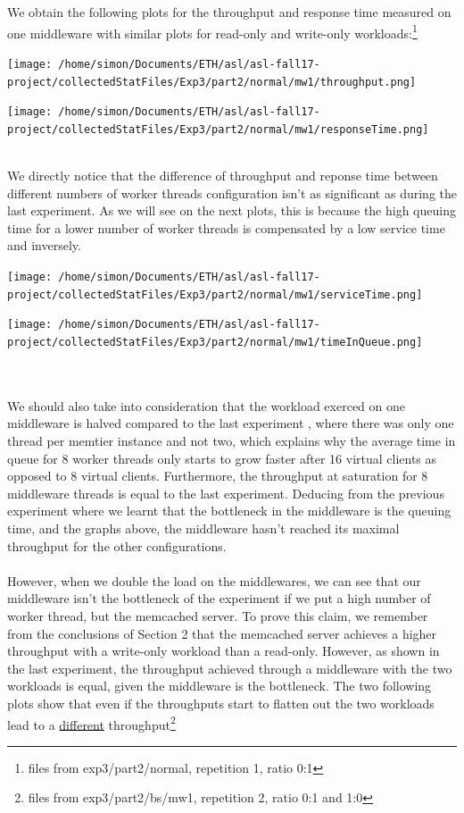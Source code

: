 \documentclass[11pt,a4paper]{article}
\begin{document}
We obtain the following plots for the throughput and response time measured on one middleware with similar plots for read-only and write-only workloads:\footnote{files from exp3/part2/normal, repetition 1, ratio 0:1}
\\
\begin{minipage}{0.42\linewidth}
\texttt{[image: /home/simon/Documents/ETH/asl/asl-fall17-project/collectedStatFiles/Exp3/part2/normal/mw1/throughput.png]}
\end{minipage}
\hfill
\begin{minipage}{0.42\linewidth}
\texttt{[image: /home/simon/Documents/ETH/asl/asl-fall17-project/collectedStatFiles/Exp3/part2/normal/mw1/responseTime.png]}
\end{minipage}
\\
We directly notice that the difference of throughput and reponse time between different numbers of worker threads configuration isn't as significant as during the last experiment. As we will see on the next plots, this is because the high queuing time for a lower number of worker threads is compensated by a low service time and inversely. 
\\
\begin{minipage}{0.49\linewidth}
\texttt{[image: /home/simon/Documents/ETH/asl/asl-fall17-project/collectedStatFiles/Exp3/part2/normal/mw1/serviceTime.png]}
\end{minipage}
\hfill
\begin{minipage}{0.49\linewidth}
\texttt{[image: /home/simon/Documents/ETH/asl/asl-fall17-project/collectedStatFiles/Exp3/part2/normal/mw1/timeInQueue.png]}
\end{minipage}
\\\\ 
We should also take into consideration that the workload exerced on one middleware is halved compared to the last experiment , where there was only one thread per memtier instance and not two, which explains why the average time in queue for 8 worker threads only starts to grow faster after 16 virtual clients as opposed to 8 virtual clients. Furthermore, the throughput at saturation for 8 middleware threads is equal to the last experiment. 
Deducing from the previous experiment where we learnt that the bottleneck in the middleware is the queuing time, and the graphs above, the middleware hasn't reached its maximal throughput for the other configurations. 
\\\\
However, when we double the load on the middlewares, we can see that our middleware isn't the bottleneck of the experiment if we put a high number of worker thread, but the memcached server. To prove this claim, we remember from the conclusions of Section 2 that the memcached server achieves a higher throughput with a write-only workload than a read-only. However, as shown in the last experiment, the throughput achieved through a middleware with the two workloads is equal, given the middleware is the bottleneck. The two following plots show that even if the throughputs start to flatten out the two workloads lead to a \underline{different} throughput\footnote{files from exp3/part2/bs/mw1, repetition 2, ratio 0:1 and 1:0}   
\end{document}
